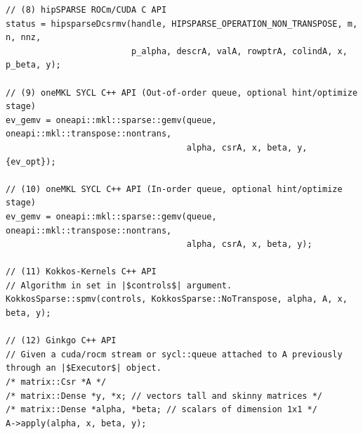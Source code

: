 \begin{listing}[htbp]
\begin{verbatim}
// (8) hipSPARSE ROCm/CUDA C API
status = hipsparseDcsrmv(handle, HIPSPARSE_OPERATION_NON_TRANSPOSE, m, n, nnz, 
                         p_alpha, descrA, valA, rowptrA, colindA, x, p_beta, y);

// (9) oneMKL SYCL C++ API (Out-of-order queue, optional hint/optimize stage)
ev_gemv = oneapi::mkl::sparse::gemv(queue, oneapi::mkl::transpose::nontrans, 
                                    alpha, csrA, x, beta, y, {ev_opt});

// (10) oneMKL SYCL C++ API (In-order queue, optional hint/optimize stage)
ev_gemv = oneapi::mkl::sparse::gemv(queue, oneapi::mkl::transpose::nontrans, 
                                    alpha, csrA, x, beta, y);

// (11) Kokkos-Kernels C++ API
// Algorithm in set in |$controls$| argument.
KokkosSparse::spmv(controls, KokkosSparse::NoTranspose, alpha, A, x, beta, y);

// (12) Ginkgo C++ API
// Given a cuda/rocm stream or sycl::queue attached to A previously through an |$Executor$| object.
/* matrix::Csr *A */
/* matrix::Dense *y, *x; // vectors tall and skinny matrices */
/* matrix::Dense *alpha, *beta; // scalars of dimension 1x1 */
A->apply(alpha, x, beta, y);
\end{verbatim}
\end{listing}








